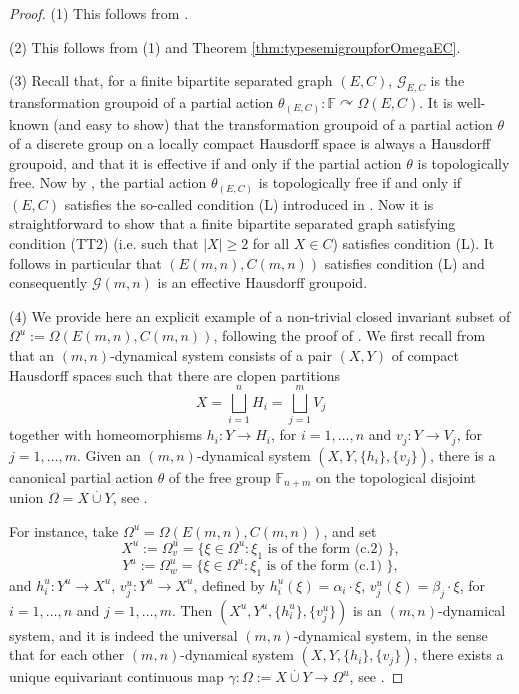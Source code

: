 \documentclass[11pt]{amsart}
\theoremstyle{plain}            %
\theoremstyle{definition}       %
\theoremstyle{definition}       %
\theoremstyle{remark}
\newcommand{\act}{\curvearrowright}
\begin{document}
\begin{proof}
(1) This follows from \cite[Theorem 7.5]{ae14}.

(2) This follows from (1) and Theorem \ref{thm:typesemigroupforOmegaEC}. 

(3) Recall that, for a finite bipartite separated graph $(E,C)$, $\mathcal G_{E,C}$ is the transformation groupoid of a partial action $\theta_{(E,C)} \colon \mathbb F \act \Omega (E,C)$.
It is well-known (and easy to show) that the transformation groupoid of a partial action $\theta$ of a discrete group on a locally compact Hausdorff space is always a Hausdorff groupoid, and that it is effective if and only if the partial action $\theta$  is topologically free. 
Now by \cite[Theorem 10.5]{ae14}, the partial action $\theta_{(E,C)}$ is topologically free if and only if $(E,C)$ satisfies the so-called condition (L) introduced in \cite[Definition 10.2]{ae14}.
Now it is straightforward to show that a finite bipartite separated graph satisfying condition (TT2) (i.e. such that $|X| \ge 2$ for all $X\in C$) satisfies condition (L). 
It follows in particular that $(E(m,n),C(m,n))$ satisfies condition (L) and consequently $\mathcal G (m,n)$ is an effective Hausdorff groupoid. 

(4) We provide here an explicit example of a non-trivial closed invariant subset of $\Omega^u := \Omega  (E(m,n),C(m,n))$, following the proof of \cite[Proposition 3.9]{aek13}. We first recall from \cite{aek13} that an $(m,n)$-dynamical system consists of a pair $(X,Y)$ of compact Hausdorff spaces such that there are clopen partitions 
$$X= \bigsqcup_{i=1}^n H_i = \bigsqcup_{j= 1}^m V_j $$
together with homeomorphisms $h_i\colon Y\to H_i$, for $i=1,\dots , n$ and $v_j\colon Y\to V_j$, for $j=1,\dots ,m$. Given an $(m,n)$-dynamical system $(X,Y, \{h_i\},\{v_j\})$, there is a canonical partial action $\theta$ of the free group $\mathbb F_{n+m}$ on the topological disjoint union 
$\Omega = X \overset{\cdot}{\cup} Y$, see \cite[Proposition 3.3]{aek13}. 

For instance, take $\Omega ^u = \Omega (E(m,n), C(m,n))$, and set 
$$ X^u :=  \Omega ^u_v  = \{\xi \in \Omega^u : \xi_1 \text{ is of the form (c.2) }\}, $$
$$Y^u :=  \Omega ^u_w  = \{\xi \in \Omega^u : \xi_1 \text{ is of the form (c.1) }\} ,$$
and $h_i^u\colon Y^u\to X^u$, $v_j^u\colon Y^u\to X^u$, defined by $h_i^u (\xi) = \alpha_i \cdot \xi$,  $v_j^u(\xi) = \beta_j \cdot \xi$, for $i=1,\dots, n$ and $j=1,\dots , m$. 
Then $(X^u,Y^u, \{h^u_i\}, \{v^u_j\})$ is an $(m,n)$-dynamical system, and it is indeed the universal $(m,n)$-dynamical system, in the sense that for each other
$(m,n)$-dynamical system $(X,Y, \{h_i\},\{v_j\})$, there exists a unique equivariant continuous map $\gamma \colon \Omega :=X\overset{\cdot}{\cup} Y \to \Omega ^u$, see \cite[Theorem 3.8]{aek13}. 


\end{proof}
\end{document}
